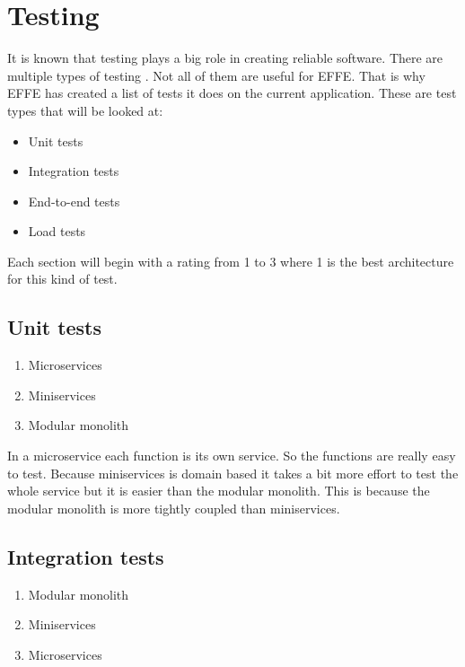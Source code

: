 \section{Testing}
\label{sec:Testing}

It is known that testing plays a big role in creating reliable software. There are multiple types of testing \cite{testTypes}. Not all of them are useful for EFFE. That is why EFFE has created a list of tests it does on the current application. These are test types that will be looked at:

\begin{itemize}
        \item Unit tests
        \item Integration tests
        \item End-to-end tests
        \item Load tests
\end{itemize}

Each section will begin with a rating from 1 to 3 where 1 is the best architecture for this kind of test.

\subsection{Unit tests}
\label{sec:UnitTests}

\begin{enumerate}
        \item Microservices
        \item Miniservices
        \item Modular monolith
\end{enumerate}

In a microservice each function is its own service. So the functions are really easy to test. Because miniservices is domain based it takes a bit more effort to test the whole service but it is easier than the modular monolith. This is because the modular monolith is more tightly coupled than miniservices.

\subsection{Integration tests}
\label{sec:IntegrationTests}

\begin{enumerate}
        \item Modular monolith
        \item Miniservices
        \item Microservices
\end{enumerate}

